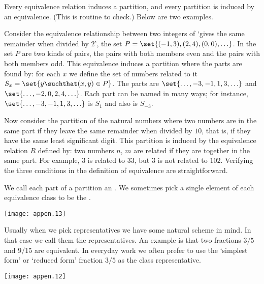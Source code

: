 Every equivalence relation induces a partition, and every 
partition is induced by an equivalence.
(This is routine to check.)
Below are two examples.
 
Consider the equivalence relationship between two integers of 
`gives the same remainder when divided by \( 2 \)',
the set \( P=\set{ (-1,3),(2,4),(0,0),\ldots} \).
In the set $P$ are two kinds of pairs, the pairs with both members even
and the pairs with both members odd.
This equivalence induces a partition where the parts are found by: 
for each \( x \) we define the set of numbers related to
it \( S_x=\set{y\suchthat (x,y)\in P} \).
The parts are
\( \set{\ldots,-3,-1,1,3,\ldots} \) and
\( \set{\ldots,-2,0,2,4,\ldots} \).
Each part can be named in many ways; for instance,
\( \set{\ldots,-3,-1,1,3,\ldots} \) is \( S_1 \) and also is \( S_{-3} \).

Now consider the partition of the natural numbers where
two numbers are in the same part if they leave the same remainder when
divided by $10$, that is, if they have the same least significant digit.
This partition is induced by the equivalence relation $R$ defined by:
two numbers $n$, $m$ are related if they are together in the same part.
For example, $3$ is related to $33$, but $3$ is not related to $102$.
Verifying the three conditions in the definition of equivalence are 
straightforward.

We call each part of a partition an .%
We sometimes pick a single element of each equivalence class to be the 
.%
\begin{center}
  \texttt{[image: appen.13]}
\end{center}
Usually when we pick representatives we have some natural scheme in mind.
In that case we call them the
 representatives.%
%
%
An example is that
two fractions \( 3/5 \) and \( 9/15 \) are equivalent.
In everyday work we often prefer to use the `simplest form' or `reduced form'
fraction $3/5$ as the class representative.
\begin{center}
  \texttt{[image: appen.12]}
\end{center}
%
